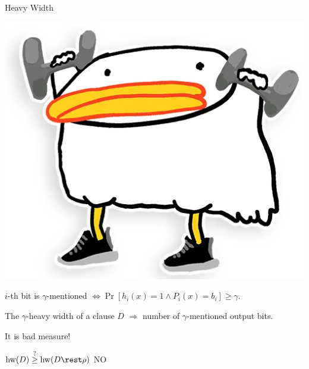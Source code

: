 \begin{frame}{Heavy Width}

    \begin{center}
        \includegraphics[scale = 0.12]{pics/utia-lift.png}        
    \end{center}

    \vspace{0.3cm}

    $i$-th bit is $\gamma$-mentioned $\Leftrightarrow \Pr[h_i(x) = 1 \land P_i(x) = b_i] \ge \gamma$.

    \begin{definition}
        The $\gamma$-heavy width of a clause $D$ $\Rightarrow$ number of $\gamma$-mentioned output bits.
    \end{definition}

    \pause
    \vspace{-1.5cm}
    \begin{minipage}[t][4cm][t]{0.5\linewidth}
        It is bad measure!
        
        \pause
        \vspace{0.2cm}
        $\mathrm{hw}(D) \stackrel{?}{\ge} \mathrm{hw}(D \rest \rho)$ \pause \hspace{0.4cm} \alert{NO}        
    \end{minipage}
    \pause
    \begin{minipage}[c][4cm][c]{0.45\linewidth}
        \vspace{2cm}
        \centering
                
    \end{minipage}

\end{frame}


